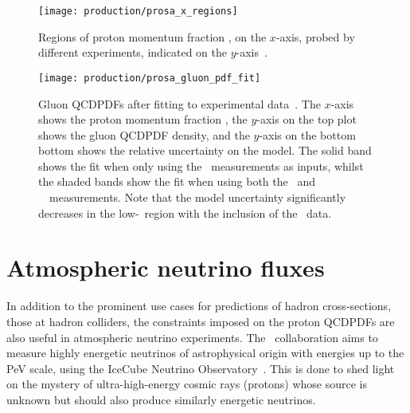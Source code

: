 %   

\begin{figure}
  \centering
  \texttt{[image: production/prosa\_x\_regions]}
  \caption{%
    Regions of proton momentum fraction \bjorkenx, on the $x$-axis, probed by 
    different experiments, indicated on the $y$-axis~\cite{Zenaiev:2015rfa}.
  }
  \label{fig:prod:theory:prosa_x_regions}
\end{figure}

\begin{figure}
  \centering
  \texttt{[image: production/prosa\_gluon\_pdf\_fit]}
  \caption{%
    Gluon \acp{QCDPDF} after fitting to experimental 
    data~\cite{Zenaiev:2015rfa}.
    The $x$-axis shows the proton momentum fraction \bjorkenx, the $y$-axis on 
    the top plot shows the gluon \ac{QCDPDF} density, and the $y$-axis on the 
    bottom bottom shows the relative uncertainty on the model.
    The solid band shows the fit when only using the \hera\ measurements as 
    inputs, whilst the shaded bands show the fit when using both the \hera\ and 
    \ \lhcb\ measurements.
    Note that the model uncertainty significantly decreases in the 
    low-\bjorkenx\ region with the inclusion of the \lhcb\ data.
  }
  \label{fig:prod:theory:prosa_gluon_pdf_fit}
\end{figure}

\section{Atmospheric neutrino fluxes}
\label{chap:prod:theory:neutrinos}

In addition to the prominent use cases for predictions of hadron 
cross-sections, those at hadron colliders, the constraints imposed on the 
proton \acp{QCDPDF} are also useful in atmospheric neutrino experiments.
The \icecube\ collaboration aims to measure highly energetic neutrinos of 
astrophysical origin with energies up to the \si{\peta\eV} scale, using the 
IceCube Neutrino Observatory~\cite{Achterberg:2006md}.
This is done to shed light on the mystery of ultra-high-energy cosmic rays 
(protons) whose source is unknown but should also produce similarly energetic
neutrinos.

